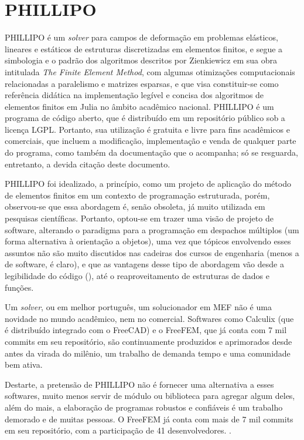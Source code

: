 

\chapter{PHILLIPO}

PHILLIPO é um \emph{solver} para campos de deformação em problemas elásticos, lineares e estáticos de estruturas discretizadas em elementos finitos, e segue a simbologia e o padrão dos algoritmos descritos por Zienkiewicz em sua obra intitulada \emph{The Finite Element Method}, com algumas otimizações computacionais relacionadas a paralelismo e matrizes esparsas, e que visa constituir-se como referência didática na implementação legível e concisa dos algoritmos de elementos finitos em Julia no âmbito acadêmico nacional. PHILLIPO é um programa de código aberto, que é distribuído em um repositório público\footnotemark[1]{} sob a licença LGPL\footnotemark[2]{}. Portanto, sua utilização é gratuita e livre para fins acadêmicos e comerciais, que incluem a modificação, implementação e venda de qualquer parte do programa, como também da documentação que o acompanha; só se resguarda, entretanto, a devida citação deste documento.

PHILLIPO foi idealizado, a princípio, como um projeto de aplicação do método de elementos finitos em um contexto de programação estruturada, porém, observou-se que essa abordagem é, senão obsoleta, já muito utilizada em pesquisas científicas. Portanto, optou-se em trazer uma visão de projeto de software, alterando o paradigma para a programação em despachos múltiplos (um forma alternativa à orientação a objetos), uma vez que tópicos envolvendo esses assuntos não são muito discutidos nas cadeiras dos cursos de engenharia (menos a de software, é claro), e que as vantagens desse tipo de abordagem vão desde a legibilidade do código (), até o reaproveitamento de estruturas de dados e funções. \cite{Bezanson}

Um \emph{solver}, ou em melhor português, um solucionador em MEF não é uma novidade no mundo acadêmico, nem no comercial. Softwares como Calculix (que é distribuído integrado com o FreeCAD) e o FreeFEM, que já conta com 7 mil commits em seu repositório, são continuamente produzidos e aprimorados desde antes da virada do milênio, um trabalho de demanda tempo e uma comunidade bem ativa.

Destarte, a pretensão de PHILLIPO não é fornecer uma alternativa a esses softwares, muito menos servir de módulo ou biblioteca para agregar algum deles, além do mais, a elaboração de programas robustos e confiáveis é um trabalho demorado e de muitas pessoas. O FreeFEM já conta com mais de 7 mil commits em seu repositório, com a participação de 41 desenvolvedores. \cite{Hecht}. 

